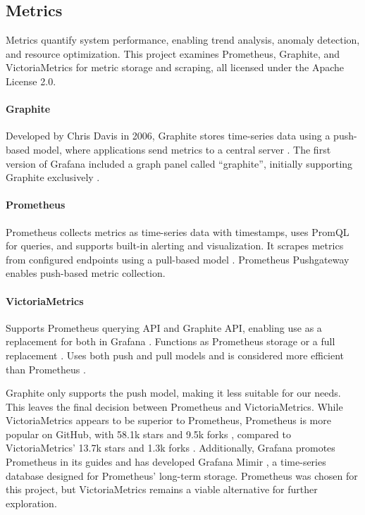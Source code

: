 \subsection{Metrics}

Metrics quantify system performance, enabling trend analysis, anomaly detection, and resource optimization. This project examines Prometheus, Graphite, and VictoriaMetrics for metric storage and scraping, all licensed under the Apache License 2.0.

\paragraph{Graphite} Developed by Chris Davis in 2006, Graphite stores time-series data using a push-based model, where applications send metrics to a central server \Parencite{grafana_graphite}. The first version of Grafana included a graph panel called ``graphite'', initially supporting Graphite exclusively \Parencite{odegaard2019grafana}.

\paragraph{Prometheus} Prometheus collects metrics as time-series data with timestamps, uses PromQL for queries, and supports built-in alerting and visualization. It scrapes metrics from configured endpoints using a pull-based model \Parencite{grafana_graphite}. Prometheus Pushgateway enables push-based metric collection.

\paragraph{VictoriaMetrics} Supports Prometheus querying API and Graphite API, enabling use as a replacement for both in Grafana \Parencite{VictoriaMetricsDocs}. Functions as Prometheus storage or a full replacement \Parencite{victoriametrics2025}. Uses both push and pull models and is considered more efficient than Prometheus \Parencite{last9_prometheus_vs_victoriametrics}.

Graphite only supports the push model, making it less suitable for our needs. This leaves the final decision between Prometheus and VictoriaMetrics. While VictoriaMetrics appears to be superior to Prometheus, Prometheus is more popular on GitHub, with 58.1k stars and 9.5k forks \Parencite{prometheus_github}, compared to VictoriaMetrics' 13.7k stars and 1.3k forks \Parencite{victoriametrics2025}. Additionally, Grafana promotes Prometheus in its guides \Parencite{grafana_prometheus_intro} and has developed Grafana Mimir \Parencite{grafana_mimir}, a time-series database designed for Prometheus' long-term storage. Prometheus was chosen for this project, but VictoriaMetrics remains a viable alternative for further exploration.

